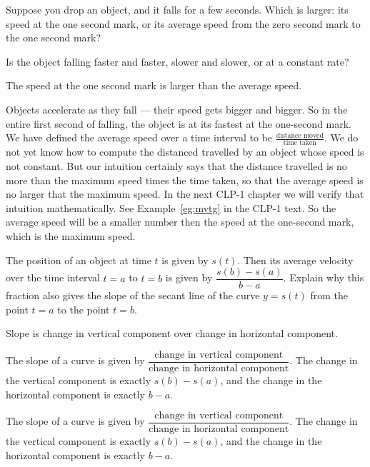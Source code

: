 \begin{question}
Suppose you drop an object, and it falls for a few seconds. Which is larger: its speed at the one second mark, or its average speed from the zero second mark to the one second mark?
\end{question}
\begin{hint}
Is the object falling faster and faster, slower and slower, or at a constant rate?
\end{hint}
\begin{answer}
The speed at the one second mark is larger than the average speed.
\end{answer}
\begin{solution}
Objects accelerate as they fall --- their speed gets bigger and bigger. 
So in the entire first second of falling, the object is at its fastest at 
the one-second mark. We have defined the average speed over a time interval
to be $\frac{\text{distance moved}}{\text{time taken}}$. We do not yet know 
how to compute the distanced travelled by an object whose speed is not constant. 
But our intuition certainly says that the distance travelled is no more than
the maximum speed times the time taken, so that the average speed is no 
larger that the maximum speed. In the next CLP-1 chapter we will verify that intuition mathematically. See Example~\ref{eg:mvtg} in the CLP-1 text.
So the average speed will be a smaller number then the speed at the 
one-second mark, which is the maximum speed.
\end{solution}

\begin{Mquestion}
The position of an object at time $t$ is given by $s(t)$. Then its average velocity over the time interval $t=a$ to $t=b$ is given by $\dfrac{s(b)-s(a)}{b-a}$. Explain why this fraction also gives the slope of the secant line of the curve $y=s(t)$ from the point $t=a$ to the point $t=b$.
\end{Mquestion}
\begin{hint}
Slope is change in vertical component over change in horizontal component.
\end{hint}
\begin{answer}
The slope of a curve is given by $\dfrac{\mbox{change in vertical component}}{\mbox{change in horizontal component}}$. The change in the vertical component is exactly $s(b)-s(a)$, and the change in the horizontal component is exactly $b-a$.
\end{answer}
\begin{solution}
The slope of a curve is given by $\dfrac{\mbox{change in vertical component}}{\mbox{change in horizontal component}}$. The change in the vertical component is exactly $s(b)-s(a)$, and the change in the horizontal component is exactly $b-a$.
\end{solution}


